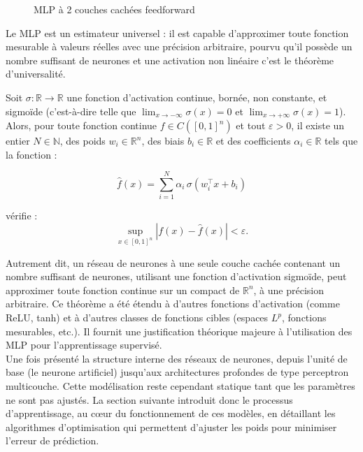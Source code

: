 \begin{figure}[H]
    \centering
    
    \caption{MLP à 2 couches cachées feedforward}
    \label{fig:mlp}
\end{figure}

Le MLP est un estimateur universel : il est capable d’approximer toute fonction mesurable à valeurs réelles avec une précision arbitraire, pourvu qu’il possède un nombre suffisant de neurones et une activation non linéaire c'est le théorème d'universalité.

\begin{theorem}
Soit \( \sigma : \mathbb{R} \rightarrow \mathbb{R} \) une fonction d’activation continue, bornée, non constante, et sigmoïde (c’est-à-dire telle que \( \lim_{x \to -\infty} \sigma(x) = 0 \) et \( \lim_{x \to +\infty} \sigma(x) = 1 \)). Alors, pour toute fonction continue \( f \in C([0,1]^n) \) et tout \( \varepsilon > 0 \), il existe un entier \( N \in \mathbb{N} \), des poids \( w_i \in \mathbb{R}^n \), des biais \( b_i \in \mathbb{R} \) et des coefficients \( \alpha_i \in \mathbb{R} \) tels que la fonction :

\begin{equation}
\hat{f}(x) = \sum_{i=1}^{N} \alpha_i \, \sigma(w_i^\top x + b_i)
\end{equation}

vérifie :
\begin{equation}
\sup_{x \in [0,1]^n} \left| f(x) - \hat{f}(x) \right| < \varepsilon.
\end{equation}
\end{theorem}

Autrement dit, un réseau de neurones à une seule couche cachée contenant un nombre suffisant de neurones, utilisant une fonction d’activation sigmoïde, peut approximer toute fonction continue sur un compact de \( \mathbb{R}^n \), à une précision arbitraire. Ce théorème a été étendu à d'autres fonctions d’activation (comme ReLU, tanh) et à d’autres classes de fonctions cibles (espaces \( L^p \), fonctions mesurables, etc.). Il fournit une justification théorique majeure à l'utilisation des MLP pour l'apprentissage supervisé.\\

Une fois présenté la structure interne des réseaux de neurones, depuis l’unité de base (le neurone artificiel) jusqu’aux architectures profondes de type perceptron multicouche. Cette modélisation reste cependant statique tant que les paramètres ne sont pas ajustés. La section suivante introduit donc le processus d’apprentissage, au cœur du fonctionnement de ces modèles, en détaillant les algorithmes d’optimisation qui permettent d’ajuster les poids pour minimiser l’erreur de prédiction.

